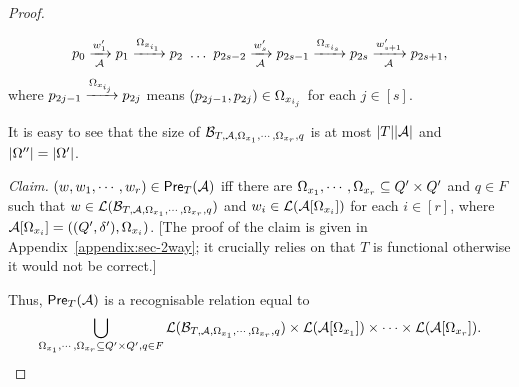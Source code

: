 \begin{proof}
\begin{itemize}
$$p_0 \xrightarrow[\mathcal{A}]{w'_1} p_1 \xrightarrow{\Omega_{x_{i_1}}} p_2\ \ldots\ p_{2s-2} \xrightarrow[\mathcal{A}]{w'_s}p_{2s-1} \xrightarrow{\Omega_{x_{i_s}}} p_{2s} \xrightarrow[\mathcal{A}]{w'_{s+1}} p_{2s+1},$$ 
where $p_{2j-1} \xrightarrow{\Omega_{x_{i_j}}} p_{2j}$ means $(p_{2j-1}, p_{2j}) \in \Omega_{x_{i_j}}$ for each $j \in [s]$.
\end{itemize}
%
%
It is easy to see that  the size of $\mathcal{B}_{T, \mathcal{A}, \Omega_{x_1}, \cdots, \Omega_{x_r}, q}$ is at most $|T||\mathcal{A}|$ and $|\Omega''| = |\Omega'|$.   

\smallskip
\noindent
\emph{Claim.} %
$(w, w_1,\cdots, w_r) \in \textsf{Pre}_{T}(\mathcal{A})$ iff there are $\Omega_{x_1}, \cdots, \Omega_{x_r} \subseteq Q' \times Q'$ and $q \in F$ such that $w \in \mathcal{L}(\mathcal{B}_{T, \mathcal{A}, \Omega_{x_1}, \cdots, \Omega_{x_r}, q})$ and $w_i \in \mathcal{L}(\mathcal{A}[\Omega_{x_i}])$ for each $i \in [r]$, where $\mathcal{A}[\Omega_{x_i}]=((Q', \delta'), \Omega_{x_i})$. [The proof of the claim is given in Appendix~\ref{appendix:sec-2way}; it crucially relies on that $T$ is functional otherwise it would not be correct.]
\smallskip

Thus, $\textsf{Pre}_{T}(\mathcal{A})$ is a recognisable relation equal to
\[
\bigcup_{\Omega_{x_1}, \cdots, \Omega_{x_r} \subseteq Q' \times Q', q\in F} \mathcal{L}(\mathcal{B}_{T, \mathcal{A}, \Omega_{x_1}, \cdots, \Omega_{x_r},q}) \times \mathcal{L}(\mathcal{A}[\Omega_{x_1}]) \times \cdots  \times \mathcal{L}(\mathcal{A}[\Omega_{x_r}]).\]
%


\end{proof}
